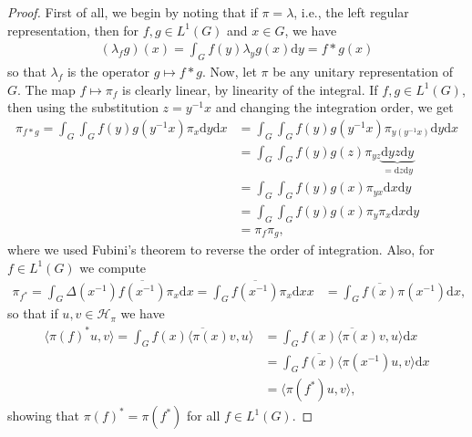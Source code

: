 \documentclass[10pt,twoside,openany,final]{memoir}
\theoremstyle{definition}
\theoremstyle{Break}
\renewcommand{\H}{\mathcal{H}}
\renewcommand{\d}{\mathrm{d}}
\begin{document}
\begin{proof}
First of all, we begin by noting that if $\pi=\lambda$, i.e., the left regular representation, then for $f,g \in L^1(G)$ and $x \in G$, we have
\begin{align*}
	(\lambda_f g)(x) = \int_G f(y) \lambda_y g(x) \d y=f \ast g(x)
\end{align*}
so that $\lambda_f$ is the operator $g \mapsto f \ast g$. Now, let $\pi$ be any unitary representation of $G$. The map $f \mapsto \pi_f$ is clearly linear, by linearity of the integral. If $f,g \in L^1(G)$, then using the substitution $z=y^{-1}x$ and changing the integration order, we get
\begin{align*}
	\pi_{f \ast g}= \int_G \int_G f(y) g(y^{-1}x) \pi_{x} \d y \d x &= \int_G \int_G f(y) g(y^{-1}x) \pi_{y(y^{-1}x)} \d y \d x\\ 
	&= \int_G \int_G f(y) g(z) \pi_{yz} \underbrace{\d yz \d y}_{=\d z \d y}\\
	&= \int_{G}\int_G f(y) g(x) \pi_{yx} \d x \d y\\
	&= \int_G \int_G f(y) g(x) \pi_y \pi_x \d x \d y\\
	&= \pi_f \pi_g,
\end{align*}
where we used Fubini's theorem to reverse the order of integration. Also, for $f \in L^1(G)$ we compute
\begin{align*}
	\pi_{f^*}= \int_G \Delta(x^{-1}) \overline{f(x^{-1})} \pi_x \d x = \int_{G }\overline{f(x^{-1})}\pi_x \d x x &= \int_G \overline{f(x)} \pi(x^{-1}) \d x,
\end{align*}
so that if $u,v \in \H_\pi$ we have
\begin{align*}
	\langle \pi(f)^* u,v \rangle =\int_G  \overline{f(x)\langle \pi(x) v,u\rangle} &= \int_G \overline{f(x) \langle \pi(x) v,u \rangle} \d x \\
	&= \int_G \overline{f(x)} \langle \pi(x^{-1}) u,v \rangle \d x\\
	&= \langle \pi(f^*) u,v\rangle,
\end{align*}
showing that $\pi(f)^*=\pi(f^*)$ for all $f \in L^1(G)$. 


\end{proof}
\end{document}
